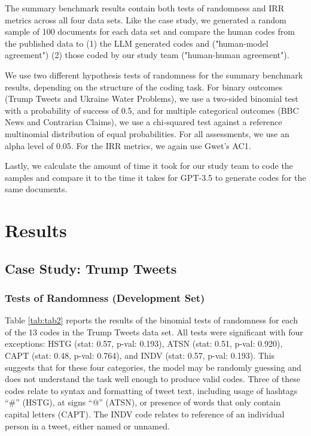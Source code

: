 \documentclass{article}
\begin{document}
The summary benchmark results contain both tests of randomness and IRR metrics across all four data sets. Like the case study, we generated a random sample of 100 documents for each data set and compare the human codes from the published data to (1) the LLM generated codes and ("human-model agreement") (2) those coded by our study team ("human-human agreement").

We use two different hypothesis tests of randomness for the summary benchmark results, depending on the structure of the coding task.  For binary outcomes (Trump Tweets and Ukraine Water Problems), we use a two-sided binomial test with a probability of success of 0.5, and for multiple categorical outcomes (BBC News and Contrarian Claims), we use a chi-squared test against a reference multinomial distribution of equal probabilities. For all assessments, we use an alpha level of 0.05. For the IRR metrics, we again use Gwet's AC1.

Lastly, we calculate the amount of time it took for our study team to code the samples and compare it to the time it takes for GPT-3.5 to generate codes for the same documents.

\section{Results}
\label{sec:results}

\subsection{Case Study: Trump Tweets}
\label{sec:case-study}

\subsubsection{Tests of Randomness (Development Set)}
\label{sec:tests-random}

Table \ref{tab:tab2} reports the results of the binomial tests of randomness for each of the 13 codes in the Trump Tweets data set.  All tests were significant with four exceptions: HSTG (stat: 0.57, p-val: 0.193), ATSN (stat: 0.51, p-val: 0.920), CAPT (stat: 0.48, p-val: 0.764), and INDV (stat: 0.57, p-val: 0.193).  This suggests that for these four categories, the model may be randomly guessing and does not understand the task well enough to produce valid codes.  Three of these codes relate to syntax and formatting of tweet text, including usage of hashtags “\#” (HSTG), at signs “@” (ATSN), or presence of words that only contain capital letters (CAPT).  The INDV code relates to reference of an individual person in a tweet, either named or unnamed.
\end{document}
